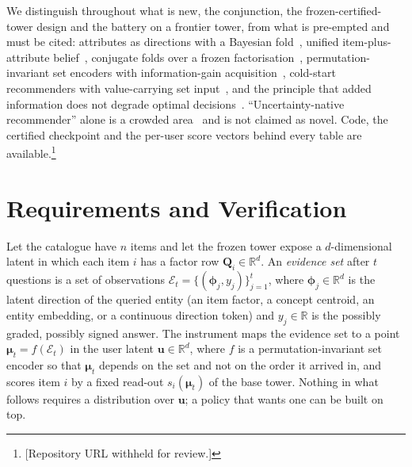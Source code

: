 \documentclass[acmsmall,review,anonymous]{acmart}
\newcommand{\R}{\mathbb{R}}
\newcommand{\Q}{\mathbf{Q}}
\newcommand{\uu}{\mathbf{u}}
\newcommand{\bphi}{\boldsymbol{\phi}}
\newcommand{\bmu}{\boldsymbol{\mu}}
\begin{document}
We distinguish throughout what is new, the conjunction, the frozen-certified-tower design and the battery on a frontier tower, from what is pre-empted and must be cited: attributes as directions with a Bayesian fold~\citep{biyik2023soft}, unified item-plus-attribute belief~\citep{li2021seamlessly}, conjugate folds over a frozen factorisation~\citep{toroghi2023bcie}, permutation-invariant set encoders with information-gain acquisition~\citep{ma2019eddi}, cold-start recommenders with value-carrying set input~\citep{lin2021tanp}, and the principle that added information does not degrade optimal decisions~\citep{good1967principle,blackwell1953equivalent}. ``Uncertainty-native recommender'' alone is a crowded area~\citep{wang2025bdecf} and is not claimed as novel. Code, the certified checkpoint and the per-user score vectors behind every table are available.\footnote{[Repository URL withheld for review.]}

\section{Requirements and Verification}\label{sec:reqs}

Let the catalogue have $n$ items and let the frozen tower expose a $d$-dimensional latent in which each item $i$ has a factor row $\Q_i\in\R^{d}$. An \emph{evidence set} after $t$ questions is a set of observations $\mathcal E_t=\{(\bphi_j, y_j)\}_{j=1}^{t}$, where $\bphi_j\in\R^{d}$ is the latent direction of the queried entity (an item factor, a concept centroid, an entity embedding, or a continuous direction token) and $y_j\in\R$ is the possibly graded, possibly signed answer. The instrument maps the evidence set to a point $\bmu_t = f(\mathcal E_t)$ in the user latent $\uu\in\R^{d}$, where $f$ is a permutation-invariant set encoder so that $\bmu_t$ depends on the set and not on the order it arrived in, and scores item $i$ by a fixed read-out $s_i(\bmu_t)$ of the base tower. Nothing in what follows requires a distribution over $\uu$; a policy that wants one can be built on top.
\end{document}
